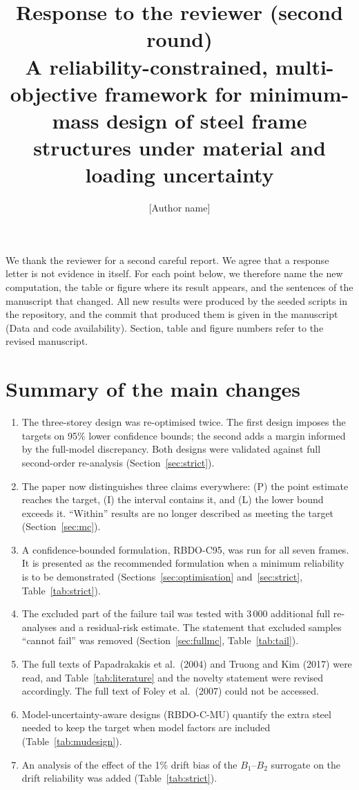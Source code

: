 \documentclass[11pt]{article}
\title{Response to the reviewer (second round)\\[0.3em]\large A reliability-constrained, multi-objective
framework for minimum-mass design of steel frame structures under material and loading uncertainty}
\author{[Author name]}
\date{}
\begin{document}
\maketitle

We thank the reviewer for a second careful report. We agree that a response letter is not evidence
in itself. For each point below, we therefore name the new computation, the table or figure where
its result appears, and the sentences of the manuscript that changed. All new results were produced
by the seeded scripts in the repository, and the commit that produced them is given in the
manuscript (Data and code availability). Section, table and figure numbers refer to the revised
manuscript.

\section*{Summary of the main changes}
\begin{enumerate}[leftmargin=1.5em,itemsep=0.1em]
\item The three-storey design was re-optimised twice. The first design imposes the targets on 95\%
lower confidence bounds; the second adds a margin informed by the full-model discrepancy. Both
designs were validated against full second-order re-analysis (Section~\ref{sec:strict}).
\item The paper now distinguishes three claims everywhere: (P) the point estimate reaches the
target, (I) the interval contains it, and (L) the lower bound exceeds it. ``Within'' results are no
longer described as meeting the target (Section~\ref{sec:mc}).
\item A confidence-bounded formulation, RBDO-C95, was run for all seven frames. It is presented as
the recommended formulation when a minimum reliability is to be demonstrated
(Sections~\ref{sec:optimisation} and~\ref{sec:strict}, Table~\ref{tab:strict}).
\item The excluded part of the failure tail was tested with 3\,000 additional full re-analyses and
a residual-risk estimate. The statement that excluded samples ``cannot fail'' was removed
(Section~\ref{sec:fullmc}, Table~\ref{tab:tail}).
\item The full texts of Papadrakakis et al.\ (2004) and Truong and Kim (2017) were read, and
Table~\ref{tab:literature} and the novelty statement were revised accordingly. The full text of
Foley et al.\ (2007) could not be accessed.
\item Model-uncertainty-aware designs (RBDO-C-MU) quantify the extra steel needed to keep the target
when model factors are included (Table~\ref{tab:mudesign}).
\item An analysis of the effect of the 1\% drift bias of the $B_1$--$B_2$ surrogate on the drift
reliability was added (Table~\ref{tab:strict}).
\end{enumerate}
\end{document}
